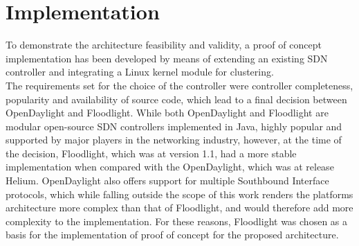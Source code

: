 
\chapter{Implementation}
\label{chapter:implementation}
To demonstrate the architecture feasibility and validity, a proof of concept implementation has been developed by means of extending an existing \gls{SDN} controller and integrating a Linux kernel module for clustering.\\
%
The requirements set for the choice of the controller were controller completeness, popularity and availability of source code, which lead to a final decision between OpenDaylight\cite{OpenDaylight} and Floodlight\cite{Floodlight}\cite{Kreutz2014}\cite{ControllerComparison}.
While both OpenDaylight and Floodlight are modular open-source \gls{SDN} controllers implemented in Java, highly popular and supported by major players in the networking industry\cite{OpenDaylight}\cite{Floodlight}, however, at the time of the decision, Floodlight, which was at version 1.1, had a more stable implementation when compared with the OpenDaylight, which was at release Helium.
OpenDaylight also offers support for multiple Southbound Interface protocols, which while falling outside the scope of this work renders the platforms architecture more complex than that of Floodlight, and would therefore add more complexity to the implementation.
For these reasons, Floodlight was chosen as a basis for the implementation of proof of concept for the proposed architecture.\\
%
